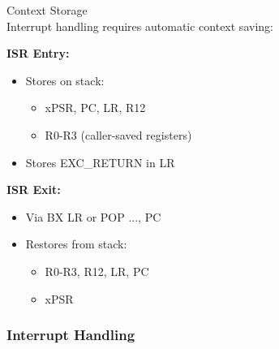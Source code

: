 \begin{definition}{Context Storage}\\
Interrupt handling requires automatic context saving:

\textbf{ISR Entry:}
\begin{itemize}
  \item Stores on stack:
    \begin{itemize}
      \item xPSR, PC, LR, R12
      \item R0-R3 (caller-saved registers)
    \end{itemize}
  \item Stores EXC\_RETURN in LR
\end{itemize}

\textbf{ISR Exit:}
\begin{itemize}
  \item Via BX LR or POP {..., PC}
  \item Restores from stack:
    \begin{itemize}
      \item R0-R3, R12, LR, PC
      \item xPSR
    \end{itemize}
\end{itemize}
\end{definition}


\subsubsection{Interrupt Handling}

